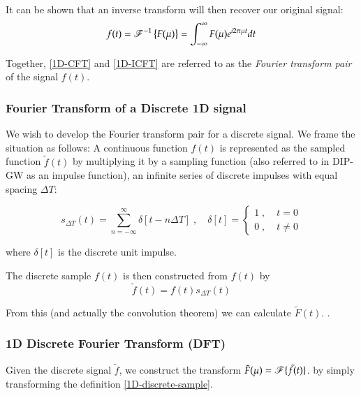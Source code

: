 	It can be shown  that an inverse transform will then recover our original signal:
	\begin{equation} \label{1D-ICFT}
		f(t) = \operatorname{\mathscr{F}}^{-1}\left\{F(\mu)\right\} = \int_{-\infty}^{\infty} F(\mu) e^{i2\pi \mu t} dt
	\end{equation}
	
	Together, \cref{1D-CFT} and \cref{1D-ICFT} are referred to as the \textit{Fourier transform pair} of the signal $f(t)$. 
	
	\subsubsection{Fourier Transform of a Discrete 1D signal}
	
	We wish to develop the Fourier transform pair for a discrete signal. We frame the situation
	as follows: A continuous function $f(t)$  is represented as the sampled function $\tilde{f}(t)$ by multiplying it by a sampling function (also referred to
	in DIP-GW as an impulse function), an infinite series of discrete impulses with equal spacing $\Delta T$:
	
	\begin{equation} \label{1D-sampling-function}
	s_{\Delta T}(t) = \sum_{n=-\infty}^{\infty} \delta[t - n\Delta T] \;,\quad
	\delta[t] = \begin{cases} 1 \;,\; & t=0 \\ 0 \;,\;& t \ne 0 \end{cases}
	\end{equation}
	
	where $\delta[t]$ is the discrete unit impulse.
	
	The discrete sample $f(t)$ is then constructed from $f(t)$ by
	\begin{equation} \label{1D-discrete-sample}
	\tilde{f}(t) = f(t) s_{\Delta T}(t)
	\end{equation}
	
	From this (and actually the convolution theorem) we can calculate $\tilde{F}(t)$. .
	
	\subsubsection{1D Discrete Fourier Transform (DFT)}
	
	Given the discrete signal $\tilde{f}$, we construct the transform
	$\tilde{F}(\mu) = \operatorname{\mathscr{F}}\{\tilde{f}(t)\}$. by simply transforming the definition \cref{1D-discrete-sample}.
	
